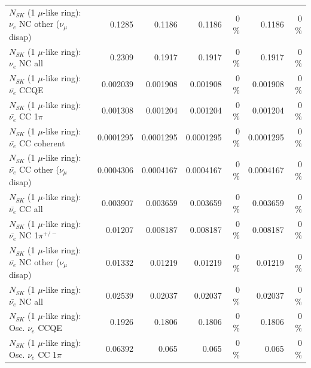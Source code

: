 \begin{table}
\begin{tabular}{| l | r | r | r  r | r  r |}
                $N_{SK}$ (1 $\mu$-like ring): $\nu_e$ NC other ($\nu_\mu$ disap) &          0.1285 &          0.1186 &          0.1186 &        0 \%  &          0.1186 &        0 \%  \\ 
                                  $N_{SK}$ (1 $\mu$-like ring): $\nu_{e}$ NC all &          0.2309 &          0.1917 &          0.1917 &        0 \%  &          0.1917 &        0 \%  \\ 
\hline
\hline
\hline
                                $N_{SK}$ (1 $\mu$-like ring): $\bar{\nu_e}$ CCQE &        0.002039 &        0.001908 &        0.001908 &        0 \%  &        0.001908 &        0 \%  \\ 
                           $N_{SK}$ (1 $\mu$-like ring): $\bar{\nu_e}$ CC 1$\pi$ &        0.001308 &        0.001204 &        0.001204 &        0 \%  &        0.001204 &        0 \%  \\ 
                         $N_{SK}$ (1 $\mu$-like ring): $\bar{\nu_e}$ CC coherent &       0.0001295 &       0.0001295 &       0.0001295 &        0 \%  &       0.0001295 &        0 \%  \\ 
          $N_{SK}$ (1 $\mu$-like ring): $\bar{\nu_e}$ CC other ($\nu_\mu$ disap) &       0.0004306 &       0.0004167 &       0.0004167 &        0 \%  &       0.0004167 &        0 \%  \\ 
                            $N_{SK}$ (1 $\mu$-like ring): $\bar{\nu_{e}}$ CC all &        0.003907 &        0.003659 &        0.003659 &        0 \%  &        0.003659 &        0 \%  \\ 
\hline
                     $N_{SK}$ (1 $\mu$-like ring): $\bar{\nu_e}$ NC 1$\pi^{+/-}$ &         0.01207 &        0.008187 &        0.008187 &        0 \%  &        0.008187 &        0 \%  \\ 
          $N_{SK}$ (1 $\mu$-like ring): $\bar{\nu_e}$ NC other ($\nu_\mu$ disap) &         0.01332 &         0.01219 &         0.01219 &        0 \%  &         0.01219 &        0 \%  \\ 
                            $N_{SK}$ (1 $\mu$-like ring): $\bar{\nu_{e}}$ NC all &         0.02539 &         0.02037 &         0.02037 &        0 \%  &         0.02037 &        0 \%  \\ 
\hline
\hline
\hline
                                 $N_{SK}$ (1 $\mu$-like ring): Osc. $\nu_e$ CCQE &          0.1926 &          0.1806 &          0.1806 &        0 \%  &          0.1806 &        0 \%  \\ 
                            $N_{SK}$ (1 $\mu$-like ring): Osc. $\nu_e$ CC 1$\pi$ &         0.06392 &           0.065 &           0.065 &        0 \%  &           0.065 &        0 \%  \\ 

\end{tabular}
\end{table}
